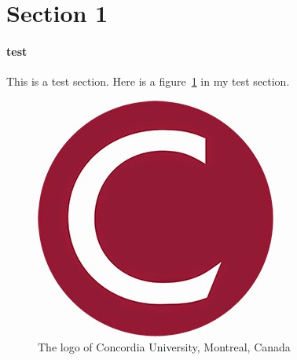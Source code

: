 \section{Section 1}
\paragraph{test}
This is a test section. Here is a figure~\ref{fig:concordia} in my test section.

\begin{figure}[h]
\centering
\includegraphics[width=0.7\linewidth]{"fig/concordia"}
\caption{The logo of Concordia University, Montreal, Canada}
\label{fig:concordia}
\end{figure}
